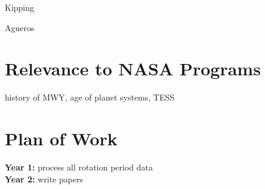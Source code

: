 \documentclass[12pt]{article}
\begin{document}
Kipping

Agueros

\section{Relevance to NASA Programs}
history of MWY, age of planet systems, TESS



\section{Plan of Work}
{\bf Year 1:} process all rotation period data
\\
{\bf Year 2:} write papers



\clearpage


\end{document}
